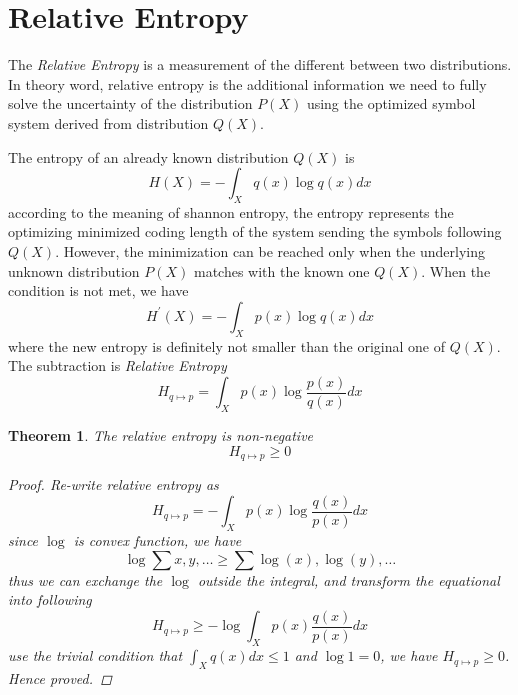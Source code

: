 \documentclass[a4paper]{article}
\newtheorem{theorem}{Theorem}[section]
\begin{document}
\section{Relative Entropy}
The \emph{Relative Entropy} is a measurement of the different between two distributions.
In theory word, relative entropy is the additional information we need to fully solve the uncertainty of the distribution $P(X)$ using the optimized symbol system derived from distribution $Q(X)$.

The entropy of an already known distribution $Q(X)$ is
\begin{equation*}
    H(X) = - \int_{X} q(x) \log{q(x)} dx
\end{equation*}
according to the meaning of shannon entropy, the entropy represents the optimizing minimized coding length of the system sending the symbols following $Q(X)$.
However, the minimization can be reached only when the underlying unknown distribution $P(X)$ matches with the known one $Q(X)$.
When the condition is not met, we have
\begin{equation}
    H^{'}(X) = - \int_{X} p(x) \log{q(x)} dx
\end{equation}
where the new entropy is definitely not smaller than the original one of $Q(X)$. The subtraction is \emph{Relative Entropy}
\begin{equation}
    H_{q \mapsto p} = \int_{X} p(x) \log{\frac{p(x)}{q(x)}} dx
    \label{eq: Relative Entropy}
\end{equation}

\begin{theorem}
    The relative entropy is non-negative
    \begin{equation}
        H_{q \mapsto p} \geqslant 0
    \end{equation}

    \begin{proof}
        Re-write relative entropy as
        \begin{equation*}
            H_{q \mapsto p} = - \int_{X} p(x) \log{\frac{q(x)}{p(x)}} dx
        \end{equation*}
        since $\log{}$ is convex function, we have
        \begin{equation*}
            \log{\sum{x, y, \dots}} \geqslant \sum{\log(x), \log(y), \dots}
        \end{equation*}
        thus we can exchange the $\log{}$ outside the integral, and transform the equational into following
        \begin{equation*}
            H_{q \mapsto p} \geqslant - \log{\int_{X} p(x) \frac{q(x)}{p(x)} dx}
        \end{equation*}
        use the trivial condition that $\int_{X} q(x) dx \leqslant 1$ and $\log{1} = 0$, we have $H_{q \mapsto p} \geqslant 0$.
        Hence proved.
    \end{proof}
\end{theorem}
\end{document}
